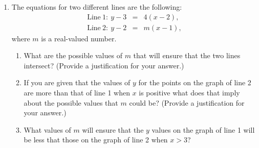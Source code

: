 \begin{enumerate}
\clearpage

\item The equations for two different lines are the
  following:
  \begin{eqnarray*}
    \mathrm{Line~1:~} y-3 & = & 4 (x-2), \\
    \mathrm{Line~2:~} y-2 & = & m (x-1),
  \end{eqnarray*}
  where $m$ is a real-valued number.

  \begin{enumerate}
  \item What are the possible values of $m$ that will ensure that the
    two lines intersect? (Provide a justification for your answer.)

    \vfill
  
  \item If you are given that the values of $y$ for the points on the
    graph of line 2 are more than that of line 1 when $x$ is positive
    what does that imply about the possible values that $m$ could be?
    (Provide a justification for your answer.)

    \vfill

  \item What values of $m$ will ensure that the $y$ values on the
    graph of line 1 will be less that those on the graph of line 2
    when $x>3$?

    \vfill

  \end{enumerate}



\end{enumerate}




